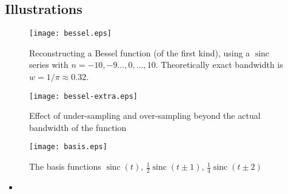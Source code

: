 \documentclass[12pt]{article}
\DeclareMathOperator{\sinc}{sinc}
\begin{document}
\subsection{Illustrations}

\begin{figure}[!htb]
\begin{center}
\texttt{[image: bessel.eps]}
\caption{Reconstructing a Bessel function (of the first kind), using a $\sinc$ series with $n = -10, -9 \dotsc, 0, \dotsc, 10$.  Theoretically exact bandwidth is $w = 1/\pi \approx 0.32$.}
\end{center}
\end{figure}

\begin{figure}[!htb]
\begin{center}
\texttt{[image: bessel-extra.eps]}
\caption{Effect of under-sampling and over-sampling beyond the actual bandwidth of the function}
\end{center}
\end{figure}

\begin{figure}[!htb]
\begin{center}
\texttt{[image: basis.eps]}
\caption{The basis functions $\sinc(t)$, $\tfrac12 \sinc(t\pm 1)$, $\tfrac14 \sinc(t \pm 2)$}
\end{center}
\end{figure}

\begin{itemize}
\item
{}
\end{itemize}

\end{document}
